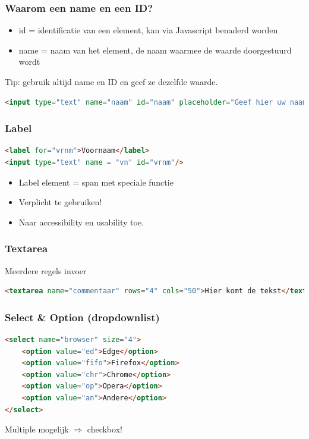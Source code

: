 \documentclass{article}
\begin{document}
\subsubsection{Waarom een name en een ID?}
\begin{itemize}
    \item id = identificatie van een element, kan via Javascript benaderd worden
    \item name = naam van het element, de naam waarmee de waarde doorgestuurd wordt
\end{itemize}


Tip: gebruik altijd name en ID en geef ze dezelfde waarde.
\begin{lstlisting}[language=HTML]
<input type="text" name="naam" id="naam" placeholder="Geef hier uw naam in" />
\end{lstlisting}    


\subsubsection{Label}

\begin{lstlisting}[language=HTML]
<label for="vrnm">Voornaam</label>
<input type="text" name = "vn" id="vrnm"/>
\end{lstlisting}

\begin{itemize}
    \item Label element = span met speciale functie
    \item Verplicht te gebruiken!
    \item Naar accessibility en usability toe.
\end{itemize}

\subsubsection{Textarea}
Meerdere regels invoer
\begin{lstlisting}[language=HTML]
<textarea name="commentaar" rows="4" cols="50">Hier komt de tekst</textarea>
\end{lstlisting}

\subsubsection{Select \& Option (dropdownlist)}
\begin{lstlisting}[language=HTML]
<select name="browser" size="4">
    <option value="ed">Edge</option>
    <option value="fifo">Firefox</option>
    <option value="chr">Chrome</option>
    <option value="op">Opera</option>
    <option value="an">Andere</option>
</select>
\end{lstlisting}
Multiple mogelijk $\Rightarrow$ checkbox!
\end{document}
